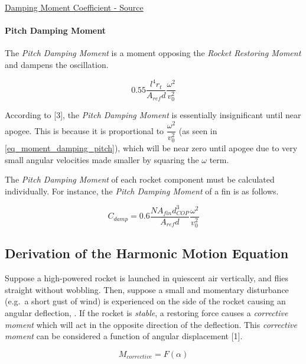 \documentclass[]{article}
\let\oldparagraph\paragraph
\renewcommand{\paragraph}[1]{\oldparagraph{#1}\mbox{}}
\begin{document}
\href{https://www.apogeerockets.com/education/downloads/Newsletter195.pdf}{Damping
Moment Coefficient - Source}

\paragraph{Pitch Damping Moment}\label{pitch-damping-moment}

The \emph{Pitch Damping Moment} is a moment opposing the \emph{Rocket
Restoring Moment} and dampens the oscillation.

\begin{equation}
\label{eq_moment_damping_pitch}
0.55 \dfrac{l^4 r_t}{A_{ref} d} \dfrac{\omega^2}{v^2_0}
\end{equation}

According to {[}3{]}, the \emph{Pitch Damping Moment} is essentially
insignificant until near apogee. This is because it is proportional to
\(\dfrac{\omega^2}{v^2_0}\) (as seen in \ref{eq_moment_damping_pitch}),
which will be near zero until apogee due to very small angular
velocities made smaller by squaring the \(\omega\) term.

The \emph{Pitch Damping Moment} of each rocket component must be
calculated individually. For instance, the \emph{Pitch Damping Moment}
of a fin is as follows.

\begin{equation}
\label{eq_moment_damping_pitch_fin}
C_{damp} = 0.6 \dfrac{N A_{fin} d_{COP}^3}{A_{ref} d} \dfrac{\omega^2}{v^2_0}
\end{equation}

\subsection{Derivation of the Harmonic Motion
Equation}\label{derivation-of-the-harmonic-motion-equation}

Suppose a high-powered rocket is launched in quiescent air vertically,
and flies straight without wobbling. Then, suppose a small and momentary
disturbance (e.g.~a short gust of wind) is experienced on the side of
the rocket causing an angular deflection, . If the rocket is
\emph{stable}, a restoring force causes a \emph{corrective moment} which
will act in the opposite direction of the deflection. This
\emph{corrective moment} can be considered a function of angular
displacement {[}1{]}.

\begin{equation}
M_{corrective} = F (\alpha)
\end{equation}
\end{document}
